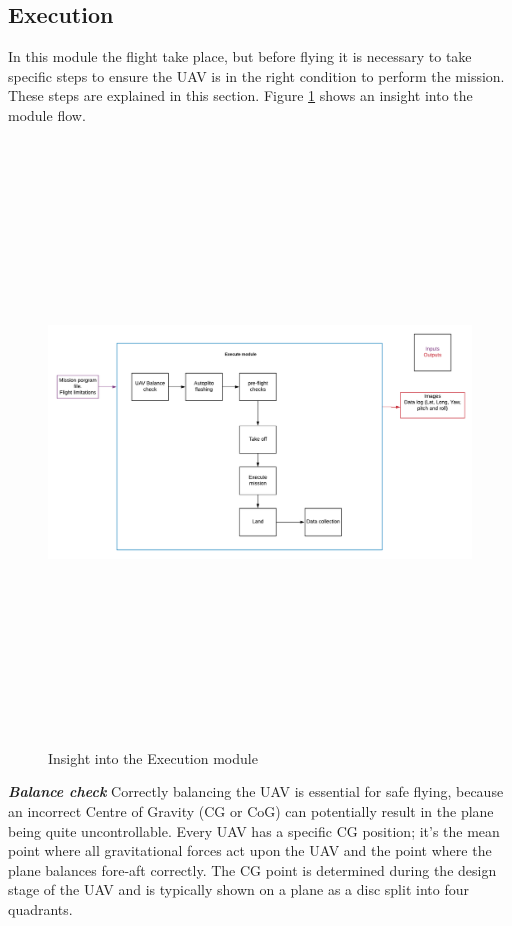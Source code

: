 \subsection{Execution}
In this module the flight take place, but before flying it is necessary to take specific steps to ensure the UAV is in the right condition to perform the mission. These steps are explained in this section.  Figure \ref{fig:execute} shows an insight into the module flow.
\begin{figure}[H]
\centering
\includegraphics[width=15cm,height=16cm,keepaspectratio]{imagenes/Execution.png}
\caption{Insight into the Execution module}
\label{fig:execute}
\end{figure}
\textit{\textbf{Balance check}} \newline
Correctly balancing the UAV is essential for safe flying, because an incorrect Centre of Gravity (CG or CoG) can potentially result in the plane being quite uncontrollable. Every UAV has a specific CG position; it's the mean point where all gravitational forces act upon the UAV and the point where the plane balances fore-aft correctly. The CG point is determined during the design stage of the UAV  and is typically shown on a plane as a disc split into four quadrants.

